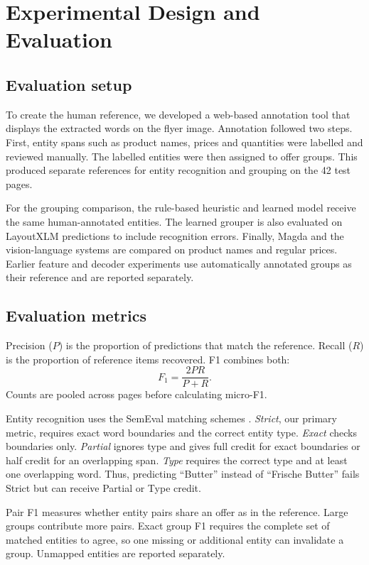 \section{Experimental Design and Evaluation}\label{sec:evaluation}
\subsection{Evaluation setup}
To create the human reference, we developed a web-based annotation tool that displays the extracted words on the flyer image. Annotation followed two steps. First, entity spans such as product names, prices and quantities were labelled and reviewed manually. The labelled entities were then assigned to offer groups. This produced separate references for entity recognition and grouping on the 42 test pages.

For the grouping comparison, the rule-based heuristic and learned model receive the same human-annotated entities. The learned grouper is also evaluated on LayoutXLM predictions to include recognition errors. Finally, Magda and the vision-language systems are compared on product names and regular prices. Earlier feature and decoder experiments use automatically annotated groups as their reference and are reported separately.

\subsection{Evaluation metrics}
Precision ($P$) is the proportion of predictions that match the reference. Recall ($R$) is the proportion of reference items recovered. F1 combines both:
\begin{equation}
 F_1=\frac{2PR}{P+R}.
\end{equation}
Counts are pooled across pages before calculating micro-F1.

Entity recognition uses the SemEval matching schemes \citep{segura2013}. \emph{Strict}, our primary metric, requires exact word boundaries and the correct entity type. \emph{Exact} checks boundaries only. \emph{Partial} ignores type and gives full credit for exact boundaries or half credit for an overlapping span. \emph{Type} requires the correct type and at least one overlapping word. Thus, predicting ``Butter'' instead of ``Frische Butter'' fails Strict but can receive Partial or Type credit.

Pair F1 measures whether entity pairs share an offer as in the reference. Large groups contribute more pairs. Exact group F1 requires the complete set of matched entities to agree, so one missing or additional entity can invalidate a group. Unmapped entities are reported separately.

